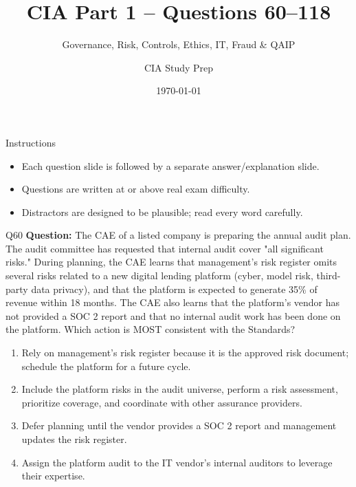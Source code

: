 \documentclass[aspectratio=169,10pt]{beamer}
\title{CIA Part 1 -- Questions 60--118}
\subtitle{Governance, Risk, Controls, Ethics, IT, Fraud \& QAIP}
\author{CIA Study Prep}
\date{\today}
\begin{document}
	
	\begin{frame}
		\titlepage
	\end{frame}
	
	\begin{frame}{Instructions}
		\begin{itemize}
			\item Each question slide is followed by a separate answer/explanation slide.
			\item Questions are written at or above real exam difficulty.
			\item Distractors are designed to be plausible; read every word carefully.
		\end{itemize}
	\end{frame}
	
	\begin{frame}[t]{Q60}
		\small
		\textbf{Question:} The CAE of a listed company is preparing the annual audit plan. The audit committee has requested that internal audit cover "all significant risks." During planning, the CAE learns that management's risk register omits several risks related to a new digital lending platform (cyber, model risk, third-party data privacy), and that the platform is expected to generate 35\% of revenue within 18 months. The CAE also learns that the platform's vendor has not provided a SOC 2 report and that no internal audit work has been done on the platform. Which action is MOST consistent with the Standards?
		\begin{enumerate}[label=\Alph*.,itemsep=1pt,topsep=2pt]
			\item Rely on management's risk register because it is the approved risk document; schedule the platform for a future cycle.
			\item Include the platform risks in the audit universe, perform a risk assessment, prioritize coverage, and coordinate with other assurance providers.
			\item Defer planning until the vendor provides a SOC 2 report and management updates the risk register.
			\item Assign the platform audit to the IT vendor's internal auditors to leverage their expertise.
		\end{enumerate}
	\end{frame}
	
\end{document}
